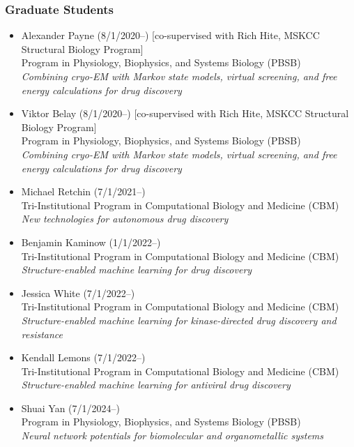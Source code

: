 \documentclass[10pt]{article}
\begin{document}
\subsubsection*{Graduate Students}

\begin{itemize}
  \item Alexander Payne (8/1/2020--) [co-supervised with Rich Hite, MSKCC Structural Biology Program] \\
  Program in Physiology, Biophysics, and Systems Biology (PBSB)\\
  \emph{Combining cryo-EM with Markov state models, virtual screening, and free energy calculations for drug discovery}
  
  \item Viktor Belay (8/1/2020--) [co-supervised with Rich Hite, MSKCC Structural Biology Program] \\
  Program in Physiology, Biophysics, and Systems Biology (PBSB)\\
  \emph{Combining cryo-EM with Markov state models, virtual screening, and free energy calculations for drug discovery}

  \item Michael Retchin (7/1/2021--) \\
  Tri-Institutional Program in Computational Biology and Medicine (CBM)\\
  \emph{New technologies for autonomous drug discovery}

  \item Benjamin Kaminow (1/1/2022--)\\
  Tri-Institutional Program in Computational Biology and Medicine (CBM)\\
  \emph{Structure-enabled machine learning for drug discovery}
  
  \item Jessica White (7/1/2022--)\\
  Tri-Institutional Program in Computational Biology and Medicine (CBM)\\
  \emph{Structure-enabled machine learning for kinase-directed drug discovery and resistance}  
  
  \item Kendall Lemons (7/1/2022--)\\
  Tri-Institutional Program in Computational Biology and Medicine (CBM)\\
  \emph{Structure-enabled machine learning for antiviral drug discovery}  

  \item Shuai Yan (7/1/2024--)\\
  Program in Physiology, Biophysics, and Systems Biology (PBSB)\\
  \emph{Neural network potentials for biomolecular and organometallic systems}

\end{itemize}
\end{document}
